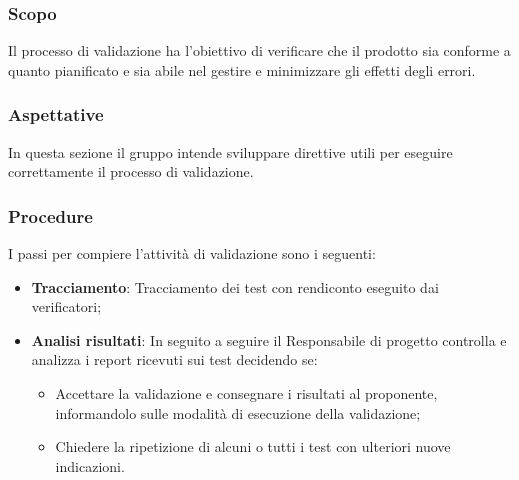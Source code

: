 \subsubsection{Scopo}
Il processo di validazione ha l’obiettivo di verificare che il prodotto sia conforme
a quanto pianificato e sia abile nel gestire e minimizzare gli effetti degli errori.

\subsubsection{Aspettative}
In questa sezione il gruppo intende sviluppare direttive utili per eseguire correttamente il processo di validazione. 




\subsubsection{Procedure}
I passi per compiere l’attività di validazione sono i seguenti:
    \begin{itemize}
        \item \textbf{Tracciamento}: Tracciamento dei test con rendiconto eseguito dai verificatori;
        \item \textbf{Analisi risultati}: In seguito a seguire il Responsabile di progetto controlla e analizza i report ricevuti sui test decidendo se:
            \begin{itemize}
                \item Accettare la validazione e consegnare i risultati al proponente, informandolo sulle modalità di esecuzione della validazione;
                \item Chiedere la ripetizione di alcuni o tutti i test con ulteriori nuove indicazioni.
            \end{itemize}
    \end{itemize}